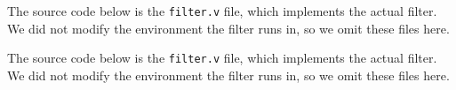 \seqfilter
\label{app:source:seq}

The source code below is the \texttt{filter.v} file, which implements the actual filter.
We did not modify the environment the filter runs in, so we omit these files here.



\strengthfilter
\label{app:source:strength}

The source code below is the \texttt{filter.v} file, which implements the actual filter.
We did not modify the environment the filter runs in, so we omit these files here.


